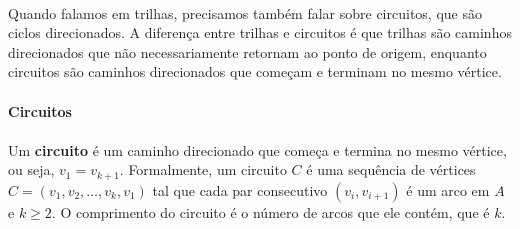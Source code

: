\documentclass[12pt,a4paper]{article}
\begin{document}
\paragraph{}
Quando falamos em trilhas, precisamos também falar sobre circuitos, que são ciclos direcionados.
A diferença entre trilhas e circuitos é que trilhas são caminhos direcionados que não necessariamente retornam ao ponto de origem, enquanto circuitos são caminhos direcionados que começam e terminam no mesmo vértice.

\paragraph{Circuitos}
\paragraph{}
 Um \textbf{circuito} é um caminho direcionado que começa e termina no mesmo vértice, ou seja, \(v_1 = v_{k+1}\). Formalmente, um circuito \(C\) é uma sequência de vértices \(C = (v_1, v_2, \ldots, v_k, v_1)\) tal que cada par consecutivo \((v_i, v_{i+1})\) é um arco em \(A\) e \(k \geq 2\). O comprimento do circuito é o número de arcos que ele contém, que é \(k\).

\begin{center}
\label{fig:ciclo-direcionado}
\end{center}
\end{document}
